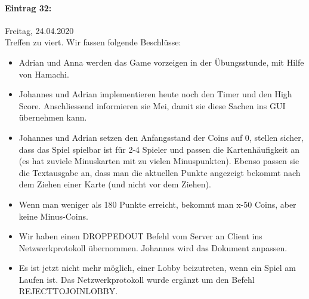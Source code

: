 \documentclass[12pt]{article}
\begin{document}
\paragraph{Eintrag 32:}
Freitag, 24.04.2020\\
Treffen zu viert. Wir fassen folgende Beschl\"usse:
\begin{itemize}
\item Adrian und Anna werden das Game vorzeigen in der \"Ubungsstunde, mit Hilfe von Hamachi.
\item Johannes und Adrian implementieren heute noch den Timer und den High Score. Anschliessend informieren sie Mei, damit sie diese Sachen ins GUI \"ubernehmen kann.
\item Johannes und Adrian setzen den Anfangsstand der Coins auf 0, stellen sicher, dass das Spiel spielbar ist f\"ur 2-4 Spieler und passen die Kartenh\"aufigkeit an (es hat zuviele Minuskarten mit zu vielen Minuspunkten). Ebenso passen sie die Textausgabe an, dass man die aktuellen Punkte angezeigt bekommt nach dem Ziehen einer Karte (und nicht vor dem Ziehen).
\item Wenn man weniger als 180 Punkte erreicht, bekommt man x-50 Coins, aber keine Minus-Coins.
\item Wir haben einen DROPPEDOUT Befehl vom Server an Client ins Netzwerkprotokoll \"ubernommen. Johannes wird das Dokument anpassen.
\item Es ist jetzt nicht mehr m\"oglich, einer Lobby beizutreten, wenn ein Spiel am Laufen ist. Das Netzwerkprotokoll wurde erg\"anzt um den Befehl REJECTTOJOINLOBBY.
\end{itemize}
\end{document}
